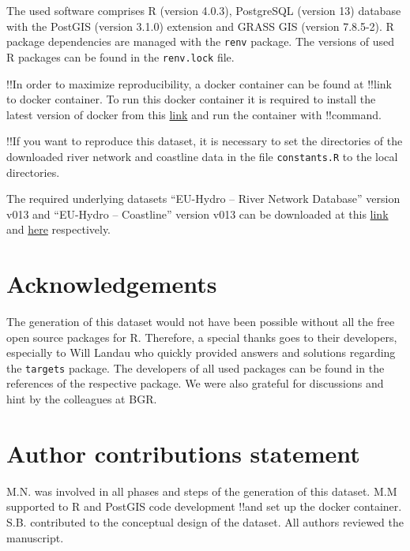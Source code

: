 \documentclass[fleqn,10pt]{wlscirep}
\begin{document}
The used software comprises R (version 4.0.3), PostgreSQL (version 13) database with the PostGIS (version 3.1.0) extension and GRASS GIS (version 7.8.5-2). R package dependencies are managed with the \texttt{renv} package. The versions of used R packages can be found in the \texttt{renv.lock} file.

!!In order to maximize reproducibility, a docker container can be found at !!link to docker container. To run this docker container it is required to install the latest version of docker from this \href{https://www.docker.com/products/docker-desktop}{link} and run the container with !!command.

!!If you want to reproduce this dataset, it is necessary to set the directories of the downloaded river network and coastline data in the file \texttt{constants.R} to the local directories.

The required underlying datasets ``EU-Hydro -- River Network Database'' version v013 and ``EU-Hydro -- Coastline'' version v013 can be downloaded at this \href{https://land.copernicus.eu/imagery-in-situ/eu-hydro/eu-hydro-river-network-database?tab=download}{link} and \href{https://land.copernicus.eu/imagery-in-situ/eu-hydro/eu-hydro-coastline?tab=download}{here} respectively.

\hypertarget{acknowledgements}{%
\section*{Acknowledgements}\label{acknowledgements}}

The generation of this dataset would not have been possible without all the free open source packages for R. Therefore, a special thanks goes to their developers, especially to Will Landau who quickly provided answers and solutions regarding the \texttt{targets} package. The developers of all used packages can be found in the references of the respective package. We were also grateful for discussions and hint by the colleagues at BGR.

\hypertarget{author-contributions-statement}{%
\section*{Author contributions statement}\label{author-contributions-statement}}

M.N. was involved in all phases and steps of the generation of this dataset. M.M supported to R and PostGIS code development !!and set up the docker container. S.B. contributed to the conceptual design of the dataset. All authors reviewed the manuscript.
\end{document}
